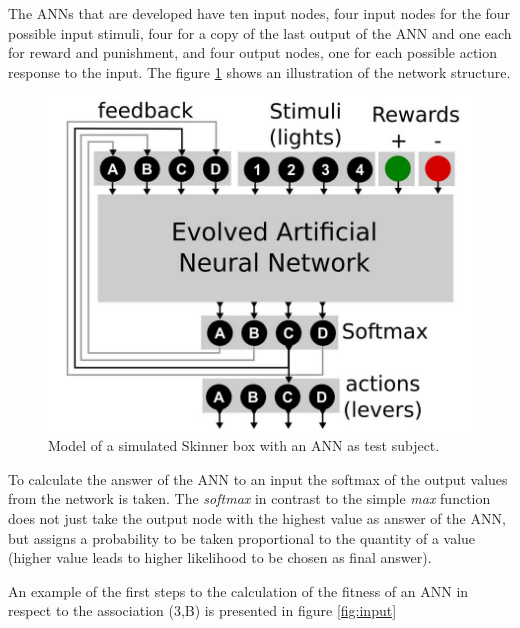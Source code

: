 \documentclass[12pt,twoside]{article}
\theoremstyle{plain}
\theoremstyle{definition}
\theoremstyle{remark}
\begin{document}
The ANNs that are developed have ten input nodes, four input nodes for the four possible input stimuli, four for a copy of the last output of the ANN and one each for reward and punishment, and four output nodes, one for each possible action response to the input.
The figure \ref{fig:formalization} shows an illustration of the network structure.

\begin{figure}[h]
	\begin{center}
		\includegraphics[width=.4\textwidth]{network_structure.png}
	\end{center}
	\caption[Model of a simulated Skinner box with an ANN as test subject.]{Model of a simulated Skinner box with an ANN as test subject.\footnotemark}
	\label{fig:formalization}
\end{figure}

To calculate the answer of the ANN to an input the softmax of the output values from the network is taken. The \textit{softmax} in contrast to the simple \textit{max} function does not just take the output node with the highest value as answer of the ANN, but assigns a probability to be taken proportional to the quantity of a value (higher value leads to higher likelihood to be chosen as final answer).\medskip

An example of the first steps to the calculation of the fitness of an ANN in respect to the association (3,B) is presented in figure \ref{fig:input}
\end{document}
